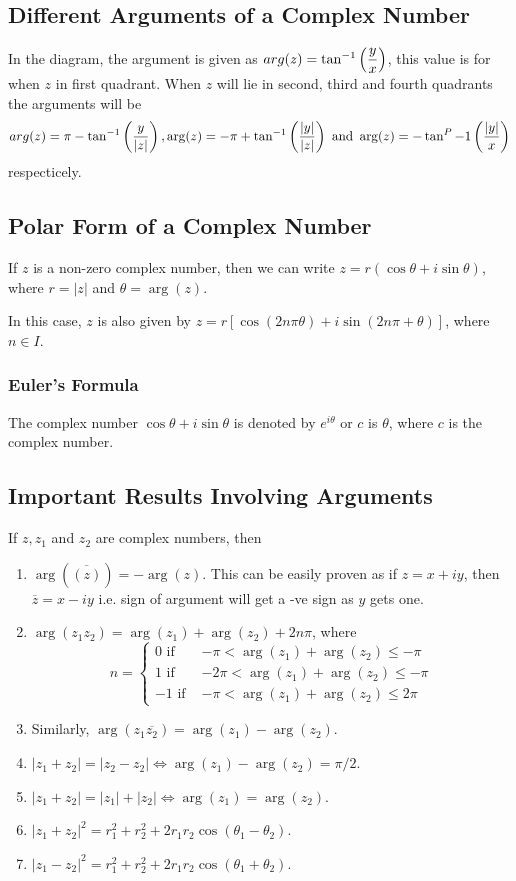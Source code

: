 \subsection{Different Arguments of a Complex Number}
In the diagram, the argument is given as $\\arg(z) = \tan^{-1}\left(\frac{y}{x}\right)$, this value is for when $z$ in first
quadrant. When $z$ will lie in second, third and fourth quadrants the arguments will be
$$\\arg(z) = \pi - \tan^{-1}\left(\frac{y}{|z|}\right), \arg(z)= -\pi + \tan^{-1}\left(\frac{|y|}{|z|}\right)\text{~and~} \arg(z) =
-\tan^P{-1}\left(\frac{|y|}{x}\right)$$
respecticely.

\subsection{Polar Form of a Complex Number}
If $z$ is a non-zero complex number, then we can write $z = r(\cos\theta + i\sin\theta)$, where $r = |z|$ and $\theta = \arg(z)$.

In this case, $z$ is also given by $z = r[\cos(2n\pi  \theta) + i\sin(2n\pi + \theta)]$, where $n\in I$.

\subsubsection{Euler's Formula}
The complex number $\cos\theta + i\sin\theta$ is denoted by $e^{i\theta}$ or $c$ is $\theta$, where $c$ is the complex number.

\subsection{Important Results Involving Arguments}
If $z, z_1$ and $z_2$ are complex numbers, then

\begin{enumerate}
\item $\arg(\overline{(z)}) = -\arg(z)$. This can be easily proven as if $z = x + iy$, then $\overline{z} = x - iy$ i.e. sign of
  argument will get a -ve sign as $y$ gets one.
\item $\arg(z_1z_2) = \arg(z_1)  + \arg(z_2) + 2n\pi$, where
  $$n = \begin{cases}
   0 \text{~if~} & -\pi<\arg(z_1)+\arg(z_2)\leq-\pi\\
   1 \text{~if~} & -2\pi<\arg(z_1)+\arg(z_2)\leq-\pi\\
   -1 \text{~if~} & -\pi<\arg(z_1)+\arg(z_2)\leq2\pi\end{cases}$$
 \item Similarly, $\arg(z_1\overline{z_2}) = \arg(z_1) - \arg(z_2)$.
 \item $|z_1 + z_2| = |z_2 - z_2| \Leftrightarrow \arg(z_1) - \arg(z_2) = \pi/2$.
 \item $|z_1 + z_2| = |z_1| + |z_2| \Leftrightarrow \arg(z_1) = \arg(z_2)$.
 \item $|z_1 + z_2|^2 = r_1^2 + r_2^2 + 2r_1r_2\cos(\theta_1 - \theta_2)$.
 \item $|z_1 - z_2|^2 = r_1^2 +r_2^2 + 2r_1r_2\cos(\theta_1 + \theta_2)$.
\end{enumerate}

